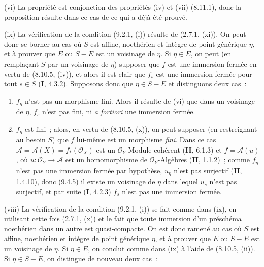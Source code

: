 (vi) La propriété est conjonction des propriétés (iv) et (vii) (8.11.1), donc
la proposition résulte dans ce cas de ce qui a déjà été prouvé.

(ix) La vérification de la condition (9.2.1, (i)) résulte de (2.7.1, (xi)). On
peut donc se borner au cas où $S$ est affine, noethérien et intègre de point
générique $\eta$, et à prouver que $E$ ou $S-E$ est un voisinage de $\eta$. Si
$\eta\in E$, on peut (en remplaçant $S$ par un voisinage de $\eta$) supposer
que $f$ est une immersion fermée en vertu de (8.10.5, (iv)), et alors il est
clair que $f_s$ est une immersion fermée pour tout $s\in S$ (\textbf{I},
4.3.2). Supposons donc que $\eta\in S-E$ et distinguons deux cas~:

\begin{enumerate}[label=\upshape{$\arabic{enumi}^\circ$}]
  \item $f_\eta$ n'est pas un morphisme fini. Alors il résulte de (vi) que dans
  un voisinage de $\eta$, $f_s$ n'est pas fini, ni \emph{a fortiori} une
  immersion fermée.

  \item $f_\eta$ est fini~; alors, en vertu de (8.10.5, (x)), on peut supposer
  (en restreignant au besoin $S$) que $f$ lui-même est un morphisme \emph{fini}.
  Dans ce cas $\mathcal A=\mathcal A(X)=f_*(\mathcal O_X)$ est un
  $\mathcal O_Y$-Module cohérent (\textbf{II}, 6.1.3) et
  $f=\mathcal A(u)$, où $u:\mathcal O_Y\to\mathcal A$ est un homomorphisme de
  $\mathcal O_Y$-Algèbres (\textbf{II}, 1.1.2)~; comme $f_\eta$ n'est pas une
  immersion fermée par hypothèse, $u_\eta$ n'est pas surjectif (\textbf{II},
  1.4.10), donc (9.4.5) il existe un voisinage de $\eta$ dans lequel $u_s$
  n'est pas surjectif, et par suite (\textbf{I}, 4.2.3) $f_s$ n'est pas une
  immersion fermée.
\end{enumerate}

(viii) La vérification de la condition (9.2.1, (i)) se fait comme dans (ix), en
utilisant cette fois (2.7.1, (x)) et le fait que toute immersion d'un préschéma
noethérien dans un autre est quasi-compacte. On est donc ramené au cas où $S$
est affine, noethérien et intègre de point générique $\eta$, et à prouver que
$E$ ou $S-E$ est un voisinage de $\eta$. Si $\eta\in E$, on conclut comme dans
(ix) à l'aide de (8.10.5, (ii)). Si $\eta\in S-E$, on distingue de nouveau
deux cas~:

